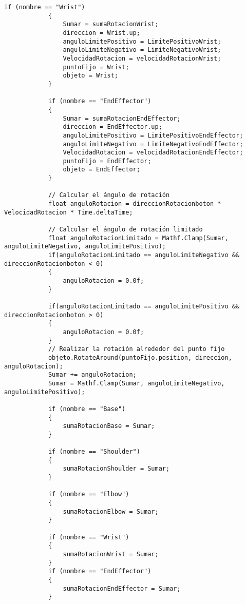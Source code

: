 \begin{lstlisting}[frame=single]
            if (nombre == "Wrist")
            {
                Sumar = sumaRotacionWrist;
                direccion = Wrist.up;
                anguloLimitePositivo = LimitePositivoWrist;
                anguloLimiteNegativo = LimiteNegativoWrist;
                VelocidadRotacion = velocidadRotacionWrist;
                puntoFijo = Wrist;
                objeto = Wrist;
            }

            if (nombre == "EndEffector")
            {
                Sumar = sumaRotacionEndEffector;
                direccion = EndEffector.up;
                anguloLimitePositivo = LimitePositivoEndEffector;
                anguloLimiteNegativo = LimiteNegativoEndEffector;
                VelocidadRotacion = velocidadRotacionEndEffector;
                puntoFijo = EndEffector;
                objeto = EndEffector;
            }
            
            // Calcular el ángulo de rotación
            float anguloRotacion = direccionRotacionboton * VelocidadRotacion * Time.deltaTime;
            
            // Calcular el ángulo de rotación limitado
            float anguloRotacionLimitado = Mathf.Clamp(Sumar, anguloLimiteNegativo, anguloLimitePositivo);
            if(anguloRotacionLimitado == anguloLimiteNegativo && direccionRotacionboton < 0)
            {
                anguloRotacion = 0.0f;
            }

            if(anguloRotacionLimitado == anguloLimitePositivo && direccionRotacionboton > 0)
            {
                anguloRotacion = 0.0f;
            }
            // Realizar la rotación alrededor del punto fijo
            objeto.RotateAround(puntoFijo.position, direccion, anguloRotacion);
            Sumar += anguloRotacion;
            Sumar = Mathf.Clamp(Sumar, anguloLimiteNegativo, anguloLimitePositivo);

            if (nombre == "Base")
            {
                sumaRotacionBase = Sumar;
            }

            if (nombre == "Shoulder")
            {
                sumaRotacionShoulder = Sumar;
            }

            if (nombre == "Elbow")
            {
                sumaRotacionElbow = Sumar;
            }

            if (nombre == "Wrist")
            {
                sumaRotacionWrist = Sumar;
            }
            if (nombre == "EndEffector")
            {
                sumaRotacionEndEffector = Sumar;
            }
            

\end{lstlisting}
